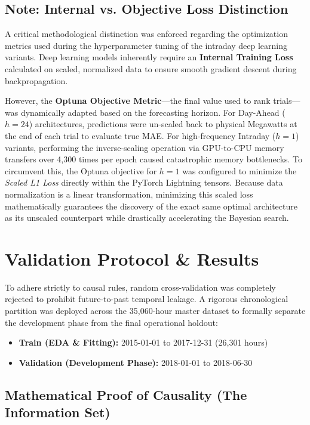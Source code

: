 \documentclass{article}
\begin{document}
\subsection*{Note: Internal vs. Objective Loss Distinction}
A critical methodological distinction was enforced regarding the optimization metrics used during the hyperparameter tuning of the intraday deep learning variants. Deep learning models inherently require an \textbf{Internal Training Loss} calculated on scaled, normalized data to ensure smooth gradient descent during backpropagation. 

However, the \textbf{Optuna Objective Metric}—the final value used to rank trials—was dynamically adapted based on the forecasting horizon. For Day-Ahead ($h=24$) architectures, predictions were un-scaled back to physical Megawatts at the end of each trial to evaluate true MAE. For high-frequency Intraday ($h=1$) variants, performing the inverse-scaling operation via GPU-to-CPU memory transfers over 4,300 times per epoch caused catastrophic memory bottlenecks. To circumvent this, the Optuna objective for $h=1$ was configured to minimize the \textit{Scaled L1 Loss} directly within the PyTorch Lightning tensors. Because data normalization is a linear transformation, minimizing this scaled loss mathematically guarantees the discovery of the exact same optimal architecture as its unscaled counterpart while drastically accelerating the Bayesian search.

\section{Validation Protocol \& Results}

To adhere strictly to causal rules, random cross-validation was completely rejected to prohibit future-to-past temporal leakage. A rigorous chronological partition was deployed across the 35,060-hour master dataset to formally separate the development phase from the final operational holdout:
\begin{itemize}
    \item \textbf{Train (EDA \& Fitting):} 2015-01-01 to 2017-12-31 (26,301 hours)
    \item \textbf{Validation (Development Phase):} 2018-01-01 to 2018-06-30
\end{itemize}

\subsection*{Mathematical Proof of Causality (The Information Set)}
\end{document}
